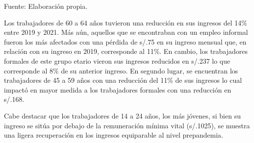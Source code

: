 \documentclass[
  letterpaper,
  12pt,
  oneside,
  spanish,
  doublespacing,
  headsepline,
  parskip]{MastersDoctoralThesis}
\begin{document}
\noindent \small Fuente: Elaboración propia. \normalsize

Los trabajadores de 60 a 64 años tuvieron una reducción en sus ingresos
del 14\% entre 2019 y 2021. Más aún, aquellos que se encontraban con un
empleo informal fueron los más afectados con una pérdida de s/.75 en su
ingreso mensual que, en relación con su ingreso en 2019, corresponde al
11\%. En cambio, los trabajadores formales de este grupo etario vieron
sus ingresos reducidos en s/.237 lo que corresponde al 8\% de su
anterior ingreso. En segundo lugar, se encuentran los trabajadores de 45
a 59 años con una reducción del 11\% de sus ingresos lo cual impactó en
mayor medida a los trabajadores formales con una reducción en s/.168.

Cabe destacar que los trabajadores de 14 a 24 años, los más jóvenes, si
bien su ingreso se sitúa por debajo de la remuneración mínima vital
(s/.1025), se muestra una ligera recuperación en los ingresos
equiparable al nivel prepandemia.
\end{document}
